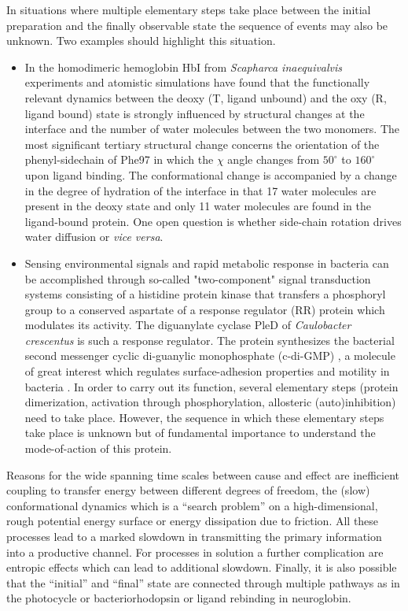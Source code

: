 \documentclass[journal=jacsat,manuscript=article]{achemso}
\begin{document}
In situations where multiple elementary steps take place between the
initial preparation and the finally observable state the sequence of
events may also be unknown. Two examples should highlight this
situation.
\begin{itemize}
\item In the homodimeric hemoglobin HbI from {\it Scapharca
  inaequivalvis}
  experiments\cite{Song1993,Royer1990,Knapp2005,Nienhaus2007,Chiancone2000,Eaton1999,choi2010}
  and atomistic simulations\cite{Zhou2003,Knapp2009,MM.scapharca:2016}
  have found that the functionally relevant dynamics between the deoxy
  (T, ligand unbound) and the oxy (R, ligand bound) state is strongly
  influenced by structural changes at the interface and the number of
  water molecules between the two monomers. The most significant
  tertiary structural change concerns the orientation of the
  phenyl-sidechain of Phe97 in which the $\chi$ angle changes from
  $50^\circ$ to $160^\circ$ upon ligand binding. The conformational
  change is accompanied by a change in the degree of hydration of the
  interface in that 17 water molecules are present in the deoxy state
  and only 11 water molecules are found in the ligand-bound
  protein. One open question is whether side-chain rotation drives
  water diffusion or {\it vice versa}.

\item Sensing environmental signals and rapid metabolic response in
  bacteria can be accomplished through so-called "two-component"
  signal transduction systems\cite{Stock2000_b} consisting of a
  histidine protein kinase that transfers a phosphoryl group to a
  conserved aspartate of a response regulator (RR) protein which
  modulates its activity. The diguanylate cyclase PleD of {\it
    Caulobacter crescentus} is such a response
  regulator.\cite{Aldridge1999,Aldridge2003,Paul2004,Hecht1997} The
  protein synthesizes the bacterial second messenger cyclic
  di-guanylic monophosphate (c-di-GMP) \cite{Paul2004}, a molecule of
  great interest which regulates surface-adhesion properties and
  motility in bacteria \cite{Malone2006}. In order to carry out its
  function, several elementary steps (protein dimerization, activation
  through phosphorylation, allosteric (auto)inhibition) need to take
  place.\cite{Jenal2006} However, the sequence in which these
  elementary steps take place is unknown but of fundamental importance
  to understand the mode-of-action of this protein.
\end{itemize}

Reasons for the wide spanning time scales between cause and effect are
inefficient coupling to transfer energy between different degrees of
freedom, the (slow) conformational dynamics which is a ``search
problem'' on a high-dimensional, rough potential energy surface or
energy dissipation due to friction. All these processes lead to a
marked slowdown in transmitting the primary information into a
productive channel. For processes in solution a further complication
are entropic effects which can lead to additional slowdown. Finally,
it is also possible that the ``initial'' and ``final'' state are
connected through multiple pathways as in the photocycle or
bacteriorhodopsin\cite{korenstein:1978} or ligand rebinding in
neuroglobin.\cite{MM.cei:2013}
\end{document}
